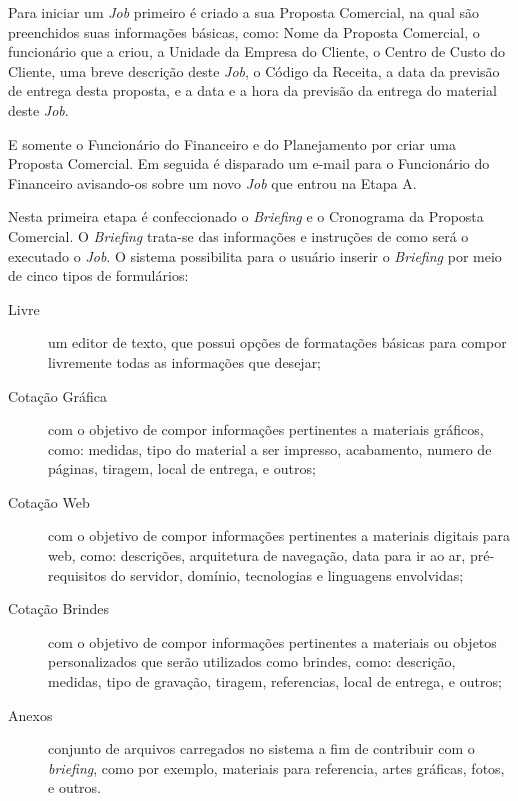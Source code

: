 \documentclass[
  12pt,				%
  openany,
  oneside,
  a4paper,			%
  english,			%
  brazil
]{article}
\numberwithin{figure}{section}
\numberwithin{table}{section}
\newcounter{subsubsubsection}[subsubsection]
\begin{document}
Para iniciar um \textit{Job} primeiro é criado a sua Proposta Comercial, na qual são preenchidos suas informações básicas, como: Nome da Proposta Comercial, o funcionário que a criou, a Unidade da Empresa do Cliente, o Centro de Custo do Cliente, uma breve descrição deste \textit{Job}, o Código da Receita, a data da previsão de entrega desta proposta, e a data e a hora da previsão da entrega do material deste \textit{Job}.

E somente o Funcionário do Financeiro e do Planejamento por criar uma Proposta Comercial. Em seguida é disparado um e-mail para o Funcionário do Financeiro avisando-os sobre um novo \textit{Job} que entrou na Etapa A.



Nesta primeira etapa é confeccionado o \textit{Briefing} e o Cronograma da Proposta Comercial. O \textit{Briefing} trata-se das informações e instruções de como será o executado o \textit{Job}. O sistema possibilita para o usuário inserir o \textit{Briefing} por meio de cinco tipos de formulários:

\begin{description}
	\item[Livre] um editor de texto, que possui opções de formatações básicas para compor livremente todas as informações que desejar;
	
	\item[Cotação Gráfica] com o objetivo de compor informações pertinentes a materiais gráficos, como: medidas, tipo do material a ser impresso, acabamento, numero de páginas, tiragem, local de entrega, e outros;
	
	\item[Cotação Web] com o objetivo de compor informações pertinentes a materiais digitais para web, como: descrições, arquitetura de navegação, data para ir ao ar, pré-requisitos do servidor, domínio, tecnologias e linguagens envolvidas;
	
	\item[Cotação Brindes] com o objetivo de compor informações pertinentes a materiais ou objetos personalizados que serão utilizados como brindes, como: descrição, medidas, tipo de gravação, tiragem, referencias, local de entrega, e outros;
	
	\item[Anexos] conjunto de arquivos carregados no sistema a fim de contribuir com o \textit{briefing}, como por exemplo, materiais para referencia, artes gráficas, fotos, e outros.
\end{description}
\end{document}
